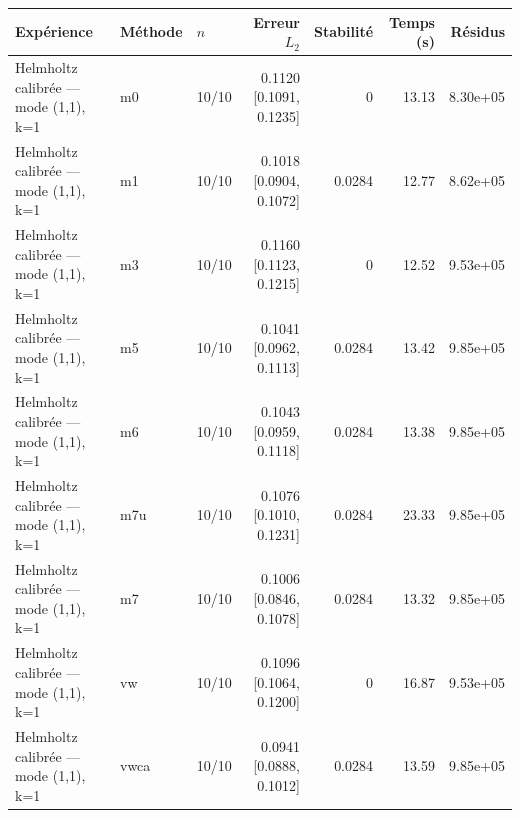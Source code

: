 \begin{tabular}{lllrrrr}
\toprule
Expérience & Méthode & $n$ & Erreur $L_2$ & Stabilité & Temps (s) & Résidus \\
\midrule
Helmholtz calibrée — mode (1,1), k=1 & m0 & 10/10 & 0.1120 [0.1091, 0.1235] & 0 & 13.13 & 8.30e+05 \\
Helmholtz calibrée — mode (1,1), k=1 & m1 & 10/10 & 0.1018 [0.0904, 0.1072] & 0.0284 & 12.77 & 8.62e+05 \\
Helmholtz calibrée — mode (1,1), k=1 & m3 & 10/10 & 0.1160 [0.1123, 0.1215] & 0 & 12.52 & 9.53e+05 \\
Helmholtz calibrée — mode (1,1), k=1 & m5 & 10/10 & 0.1041 [0.0962, 0.1113] & 0.0284 & 13.42 & 9.85e+05 \\
Helmholtz calibrée — mode (1,1), k=1 & m6 & 10/10 & 0.1043 [0.0959, 0.1118] & 0.0284 & 13.38 & 9.85e+05 \\
Helmholtz calibrée — mode (1,1), k=1 & m7u & 10/10 & 0.1076 [0.1010, 0.1231] & 0.0284 & 23.33 & 9.85e+05 \\
Helmholtz calibrée — mode (1,1), k=1 & m7 & 10/10 & 0.1006 [0.0846, 0.1078] & 0.0284 & 13.32 & 9.85e+05 \\
Helmholtz calibrée — mode (1,1), k=1 & vw & 10/10 & 0.1096 [0.1064, 0.1200] & 0 & 16.87 & 9.53e+05 \\
Helmholtz calibrée — mode (1,1), k=1 & vwca & 10/10 & 0.0941 [0.0888, 0.1012] & 0.0284 & 13.59 & 9.85e+05 \\
\bottomrule
\end{tabular}
